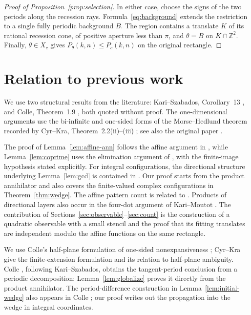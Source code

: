 \documentclass[11pt]{article}
\numberwithin{equation}{section}
\theoremstyle{definition}
\theoremstyle{remark}
\newcommand{\Z}{\mathbb Z}
\begin{document}
\begin{proof}[Proof of Proposition~\ref{prop:selection}]
In either case, choose the signs of the two periods along the recession rays.
Formula~\eqref{eq:background} extends the restriction to a single fully periodic background $B$. The
region contains a translate $K$ of its rational recession cone, of positive aperture less than
$\pi$, and $\theta=B$ on $K\cap\Z^2$. Finally, $\theta\in X_c$ gives $P_\theta(k,n)\le P_c(k,n)$ on
the original rectangle.
\end{proof}

\appendix
\section{Relation to previous work}\label{app:sources}
We use two structural results from the literature: Kari--Szabados, Corollary~13 \cite{KS}, and Colle,
Theorem~1.9 \cite{Colle}, both quoted without proof. The one-dimensional arguments use the bi-infinite
and one-sided forms of the Morse--Hedlund theorem recorded by Cyr--Kra, Theorem~2.2(ii)--(iii)
\cite{CK}; see also the original paper \cite{MH}.

The proof of Lemma~\ref{lem:affine-ann} follows the affine argument in \cite[Lemma~5]{KS}, while
Lemma~\ref{lem:coprime} uses the elimination argument of \cite[Lemma~8]{KMalg}, with the finite-image
hypothesis stated explicitly. For integral configurations, the directional structure underlying
Lemma~\ref{lem:gcd} is contained in \cite[Corollaries~28--29]{KS}. Our proof starts from the product
annihilator and also covers the finite-valued complex configurations in Theorem~\ref{thm:wedge}. The
affine pattern count is related to \cite[Lemmas~33 and~36]{KS}. Products of directional layers also
occur in the four-dot argument of Kari--Moutot \cite[proof of Theorem~11]{KMalg}. The contribution of
Sections~\ref{sec:observable}--\ref{sec:count} is the construction of a quadratic observable with a
small stencil and the proof that its fitting translates are independent modulo the affine functions on
the same rectangle.

We use Colle's half-plane formulation of one-sided nonexpansiveness \cite[Section~1]{Colle}; Cyr--Kra
\cite[Definition~3.1 and Lemma~3.2]{CK} give the finite-extension formulation and its relation to
half-plane ambiguity. Colle \cite[Proposition~2.14]{Colle}, following Kari--Szabados, obtains the
tangent-period conclusion from a periodic decomposition; Lemma~\ref{lem:globalize} proves it directly
from the product annihilator. The period-difference construction in Lemma~\ref{lem:initial-wedge} also
appears in Colle \cite[proof of Lemma~4.6, Claim~4.7]{Colle}; our proof writes out the propagation
into the wedge in integral coordinates.
\end{document}
